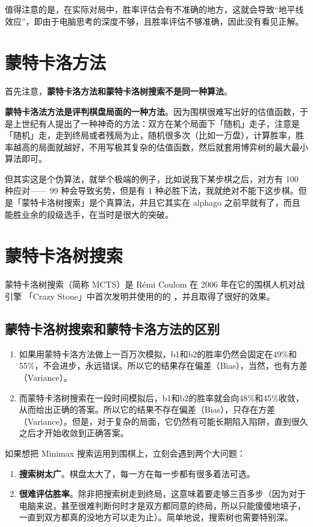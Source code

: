\documentclass[12pt]{article}
\begin{document}
值得注意的是，在实际对局中，胜率评估会有不准确的地方，这就会导致“地平线效应”，即由于电脑思考的深度不够，且胜率评估不够准确，因此没有看见正解。

\section{蒙特卡洛方法}
首先注意，\textbf{蒙特卡洛方法和蒙特卡洛树搜索不是同一种算法}。

\textbf{蒙特卡洛法方法是评判棋盘局面的一种方法}。因为围棋很难写出好的估值函数，于是上世纪有人提出了一种神奇的方法：双方在某个局面下「随机」走子，注意是「随机」走，走到终局或者残局为止，随机很多次（比如一万盘），计算胜率，胜率越高的局面就越好，不用写极其复杂的估值函数，然后就套用博弈树的最大最小算法即可。

但其实这是个伪算法，就举个极端的例子，比如说我下某步棋之后，对方有 100 种应对—— 99 种会导致劣势，但是有 1 种必胜下法，我就绝对不能下这步棋。但是「蒙特卡洛树搜索」是个真算法，并且它其实在 alphago 之前早就有了，而且能胜业余的段级选手，在当时是很大的突破。

\section{蒙特卡洛树搜索}
蒙特卡洛树搜索（简称 MCTS）是 Rémi Coulom 在 2006 年在它的围棋人机对战引擎 「Crazy Stone」中首次发明并使用的的 ，并且取得了很好的效果。

\subsection{蒙特卡洛树搜索和蒙特卡洛方法的区别}
\begin{enumerate}
\setlength{\itemsep}{0pt}
\setlength{\parsep}{0pt}
\setlength{\parskip}{0pt}
    \item 如果用蒙特卡洛方法做上一百万次模拟，b1和b2的胜率仍然会固定在49\%和55\%，不会进步，永远错误。所以它的结果存在偏差（Bias），当然，也有方差（Variance）。
    \item 而蒙特卡洛树搜索在一段时间模拟后，b1和b2的胜率就会向48\%和45\%收敛，从而给出正确的答案。所以它的结果不存在偏差（Bias），只存在方差（Variance）。但是，对于复杂的局面，它仍然有可能长期陷入陷阱，直到很久之后才开始收敛到正确答案。
\end{enumerate}

如果想把 Minimax 搜索运用到围棋上，立刻会遇到两个大问题：
\begin{enumerate}
\setlength{\itemsep}{0pt}
\setlength{\parsep}{0pt}
\setlength{\parskip}{0pt}
    \item \textbf{搜索树太广}。棋盘太大了，每一方在每一步都有很多着法可选。
    \item \textbf{很难评估胜率}。除非把搜索树走到终局，这意味着要走够三百多步（因为对于电脑来说，甚至很难判断何时才是双方都同意的终局，所以只能傻傻地填子，一直到双方都真的没地方可以走为止）。简单地说，搜索树也需要特别深。
\end{enumerate}
\end{document}
